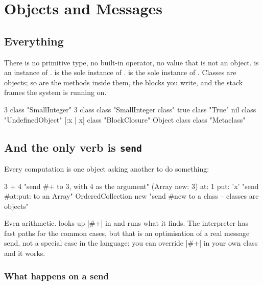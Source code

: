\chapter{Objects and Messages}
\label{ch:objects}


\section{Everything}

There is no primitive type, no built-in operator, no value that is not an
object.  is an instance of .  is the sole
instance of .  is the sole instance of .
Classes are objects; so are the methods inside them, the blocks you write, and
the stack frames the system is running on.

\begin{st}
3 class                  "SmallInteger"
3 class class            "SmallInteger class"
true class               "True"
nil class                "UndefinedObject"
[:x | x] class           "BlockClosure"
Object class class       "Metaclass"
\end{st}

\section{And the only verb is \texttt{send}}

Every computation is one object asking another to do something:

\begin{st}
3 + 4                         "send #+ to 3, with 4 as the argument"
(Array new: 3) at: 1 put: 'x' "send #at:put: to an Array"
OrderedCollection new         "send #new to a class -- classes are objects"
\end{st}

Even arithmetic.  looks up \ct|#+| in  and runs
what it finds. The interpreter has fast paths for the common cases, but that
is an optimisation of a real message send, not a special case in the language:
you can override \ct|#+| in your own class and it works.

\subsection{What happens on a send}

